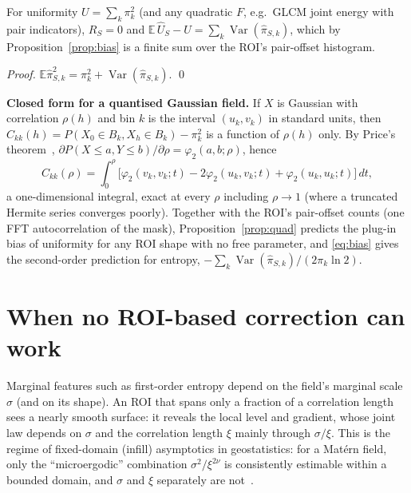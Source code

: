 \documentclass[runningheads]{llncs}
\newcommand{\E}{\mathbb{E}}
\newcommand{\Var}{\operatorname{Var}}
\begin{document}
\begin{proposition}\label{prop:quad}
For uniformity $U=\sum_k\pi_k^2$ (and any quadratic $F$, e.g.\ GLCM joint energy with pair indicators), $R_S=0$ and $\E\,\hat U_S-U=\sum_k\Var(\hat\pi_{S,k})$, which by Proposition~\ref{prop:bias} is a finite sum over the ROI's pair-offset histogram.
\end{proposition}
\noindent\emph{Proof.} $\E\hat\pi_{S,k}^2=\pi_k^2+\Var(\hat\pi_{S,k})$. \qed

\noindent\textbf{Closed form for a quantised Gaussian field.} If $X$ is Gaussian with correlation $\rho(h)$ and bin $k$ is the interval $(u_k,v_k)$ in standard units, then $C_{kk}(h)=P(X_0\in B_k,X_h\in B_k)-\pi_k^2$ is a function of $\rho(h)$ only. By Price's theorem~\cite{price1958}, $\partial P(X\le a,Y\le b)/\partial\rho=\varphi_2(a,b;\rho)$, hence
\begin{equation}
C_{kk}(\rho)=\int_0^{\rho}\big[\varphi_2(v_k,v_k;t)-2\varphi_2(u_k,v_k;t)+\varphi_2(u_k,u_k;t)\big]\,dt,\label{eq:price}
\end{equation}
a one-dimensional integral, exact at every $\rho$ including $\rho\to1$ (where a truncated Hermite series converges poorly). Together with the ROI's pair-offset counts (one FFT autocorrelation of the mask), Proposition~\ref{prop:quad} predicts the plug-in bias of uniformity for any ROI shape with no free parameter, and \eqref{eq:bias} gives the second-order prediction for entropy, $-\sum_k\Var(\hat\pi_{S,k})/(2\pi_k\ln2)$.

\section{When no ROI-based correction can work}\label{sec:ident}
Marginal features such as first-order entropy depend on the field's marginal scale $\sigma$ (and on its shape). An ROI that spans only a fraction of a correlation length sees a nearly smooth surface: it reveals the local level and gradient, whose joint law depends on $\sigma$ and the correlation length $\xi$ mainly through $\sigma/\xi$. This is the regime of fixed-domain (infill) asymptotics in geostatistics: for a Mat\'ern field, only the ``microergodic'' combination $\sigma^2/\xi^{2\nu}$ is consistently estimable within a bounded domain, and $\sigma$ and $\xi$ separately are not~\cite{zhang2004,stein1999}.
\end{document}
